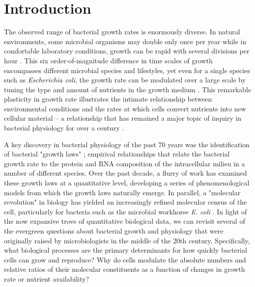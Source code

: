 
\section{Introduction}
The observed range of bacterial growth rates is enormously diverse. In natural
environments, some microbial organisms may double only once per year
\citep{mikucki2009} while in comfortable laboratory conditions, growth can be
rapid with several divisions per hour \citep{schaechter1958}. This six
order-of-magnitude difference in time scales of growth encompasses different
microbial species and lifestyles, yet even for a single species such as
\textit{Escherichia coli}, the growth rate can be modulated over a
large scale by tuning the type and amount of nutrients in the growth medium
\citep{liu2005a}. This remarkable plasticity in growth rate illustrates the
intimate relationship between environmental conditions and the rates at which
cells convert nutrients into new cellular material -- a relationship that has
remained a major topic of inquiry in bacterial physiology for over a century
\citep{jun2018}.

A key discovery in bacterial physiology of the past 70 years was the
identification of bacterial "growth laws" \citep{schaechter1958}; empirical
relationships that relate the bacterial growth rate to the protein and RNA
composition of the intracellular milieu in a number of different species.
Over the past decade, a flurry of work \citep{molenaar2009, scott2010,
klumpp2014, basan2015, dai2016, erickson2017} has examined these growth laws
at a quantitative level, developing a series of phenomenological models from
which the growth laws naturally emerge. In parallel, a "molecular revolution"
in biology has yielded an increasingly refined molecular census of the cell,
particularly for bacteria such as the microbial workhorse \textit{E. coli}
\citep{schmidt2016, davidi2016a}. In light of the now expansive trove of
quantitative biological data, we can revisit several of the evergreen
questions about bacterial growth and physiology that were originally raised
by microbiologists in the middle of the 20th century. Specifically, what
biological processes are the primary determinants for how quickly bacterial
cells can grow and reproduce? Why do cells modulate the absolute numbers and
relative ratios of their molecular constituents as a function of changes in
growth rate or nutrient availability?

